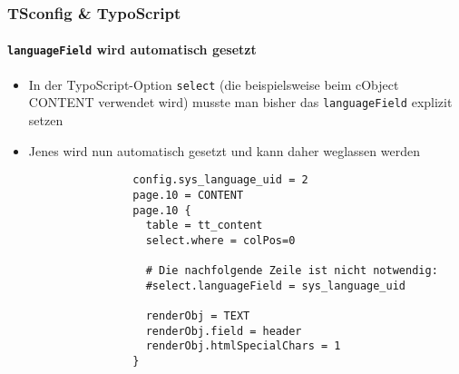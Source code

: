 
\begin{frame}[fragile]
	\frametitle{TSconfig \& TypoScript}
	\framesubtitle{\texttt{languageField} wird automatisch gesetzt}

	\lstset{basicstyle=\tiny\ttfamily}

	\begin{itemize}

		\item In der TypoScript-Option \texttt{select} (die beispielsweise beim cObject CONTENT verwendet wird)
			musste man bisher das \texttt{languageField} explizit setzen

		\item Jenes wird nun automatisch gesetzt und kann daher weglassen werden


			\begin{lstlisting}
				config.sys_language_uid = 2
				page.10 = CONTENT
				page.10 {
				  table = tt_content
				  select.where = colPos=0

				  # Die nachfolgende Zeile ist nicht notwendig:
				  #select.languageField = sys_language_uid

				  renderObj = TEXT
				  renderObj.field = header
				  renderObj.htmlSpecialChars = 1
				}
			\end{lstlisting}

	\end{itemize}

\end{frame}


